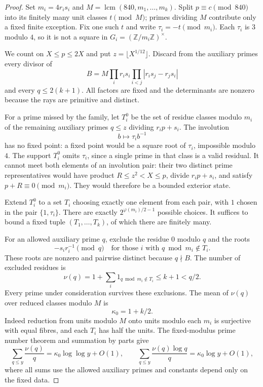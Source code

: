 \documentclass[11pt]{article}
\theoremstyle{remark}\newtheorem{remark}[theorem]{Remark}
\newcommand{\Z}{\mathbb Z}
\newcommand{\lcm}{\operatorname{lcm}}
\begin{document}
\begin{proof}
Set $m_i=4r_is_i$ and $M=\lcm(840,m_1,\ldots,m_k)$. Split $p\equiv c\pmod{840}$ into its finitely many unit classes $t\pmod M$; primes dividing $M$ contribute only a fixed finite exception. Fix one such $t$ and write $\tau_i=-t\pmod{m_i}$. Each $\tau_i$ is $3$ modulo $4$, so it is not a square in $G_i=(\Z/m_i\Z)^\times$.

We count on $X\le p\le2X$ and put $z=\lfloor X^{1/12}\rfloor$. Discard from the auxiliary primes every divisor of
\[
 B=M\prod_i r_is_i\prod_{i<j}|r_is_j-r_js_i|
\]
and every $q\le2(k+1)$. All factors are fixed and the determinants are nonzero because the rays are primitive and distinct.

For a prime missed by the family, let $T_i^0$ be the set of residue classes modulo $m_i$ of the remaining auxiliary primes $q\le z$ dividing $r_ip+s_i$. The involution
\[
 b\mapsto\tau_i b^{-1}
\]
has no fixed point: a fixed point would be a square root of $\tau_i$, impossible modulo $4$. The support $T_i^0$ omits $\tau_i$, since a single prime in that class is a valid residual. It cannot meet both elements of an involution pair: their two distinct prime representatives would have product $R\le z^2<X\le p$, divide $r_ip+s_i$, and satisfy $p+R\equiv0\pmod{m_i}$. They would therefore be a bounded exterior state.

Extend $T_i^0$ to a set $T_i$ choosing exactly one element from each pair, with $1$ chosen in the pair $\{1,\tau_i\}$. There are exactly $2^{\varphi(m_i)/2-1}$ possible choices. It suffices to bound a fixed tuple $(T_1,\ldots,T_k)$, of which there are finitely many.

For an allowed auxiliary prime $q$, exclude the residue $0$ modulo $q$ and the roots
\[
 -s_i r_i^{-1}\pmod q\quad\text{for those }i\text{ with }q\bmod m_i\notin T_i.
\]
These roots are nonzero and pairwise distinct because $q\nmid B$. The number of excluded residues is
\[
 \nu(q)=1+\sum_i1_{q\bmod m_i\notin T_i}\le k+1<q/2.
\]
Every prime under consideration survives these exclusions. The mean of $\nu(q)$ over reduced classes modulo $M$ is
\[
 \kappa_0=1+k/2.
\]
Indeed reduction from units modulo $M$ onto units modulo each $m_i$ is surjective with equal fibres, and each $T_i$ has half the units. The fixed-modulus prime number theorem and summation by parts give
\begin{equation}\label{eq:nuavg}
 \sum_{q\le y}\frac{\nu(q)}q=\kappa_0\log\log y+O(1),\qquad
 \sum_{q\le y}\frac{\nu(q)\log q}{q}=\kappa_0\log y+O(1),
\end{equation}
where all sums use the allowed auxiliary primes and constants depend only on the fixed data.


\end{proof}
\end{document}

